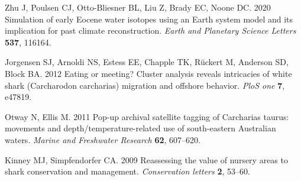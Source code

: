 \documentclass[]{rsos}%
\begin{document}
\begin{thebibliography}{99}
Zhu J, Poulsen CJ, Otto-Bliesner BL, Liu Z, Brady EC, Noone DC. 2020
  Simulation of early Eocene water isotopes using an Earth system model and its
  implication for past climate reconstruction. {\em Earth and Planetary Science
  Letters} \textbf{537}, 116164.

Jorgensen SJ, Arnoldi NS, Estess EE, Chapple TK, R{\"u}ckert M, Anderson SD,
  Block BA. 2012  Eating or meeting? Cluster analysis reveals intricacies of
  white shark (Carcharodon carcharias) migration and offshore behavior. {\em
  PloS one} \textbf{7}, e47819.

Otway N, Ellis M. 2011  Pop-up archival satellite tagging of Carcharias taurus:
  movements and depth/temperature-related use of south-eastern Australian
  waters. {\em Marine and Freshwater Research} \textbf{62}, 607--620.

Kinney MJ, Simpfendorfer CA. 2009  Reassessing the value of nursery areas to
  shark conservation and management. {\em Conservation letters} \textbf{2},
  53--60.

\end{thebibliography}
\end{document}
